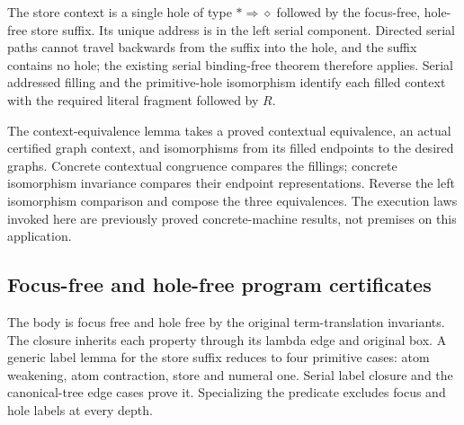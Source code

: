 

The store context is a single hole of type $*\Rightarrow\diamond$ followed
by the focus-free, hole-free store suffix. Its unique address is in the left
serial component. Directed serial paths cannot travel backwards from the
suffix into the hole, and the suffix contains no hole; the existing serial
binding-free theorem therefore applies. Serial addressed filling and the
primitive-hole isomorphism identify each filled context with the required
literal fragment followed by $R$.



The context-equivalence lemma takes a proved contextual equivalence, an
actual certified graph context, and isomorphisms from its filled endpoints
to the desired graphs. Concrete contextual congruence compares the fillings;
concrete isomorphism invariance compares their endpoint representations.
Reverse the left isomorphism comparison and compose the three equivalences.
The execution laws invoked here are previously proved concrete-machine
results, not premises on this application.


\subsection{Focus-free and hole-free program certificates}

The body is focus free and hole free by the original term-translation
invariants. The closure inherits each property through its lambda edge and
original box. A generic label lemma for the store suffix reduces to four
primitive cases: atom weakening, atom contraction, store and numeral one.
Serial label closure and the canonical-tree edge cases prove it. Specializing
the predicate excludes focus and hole labels at every depth.




